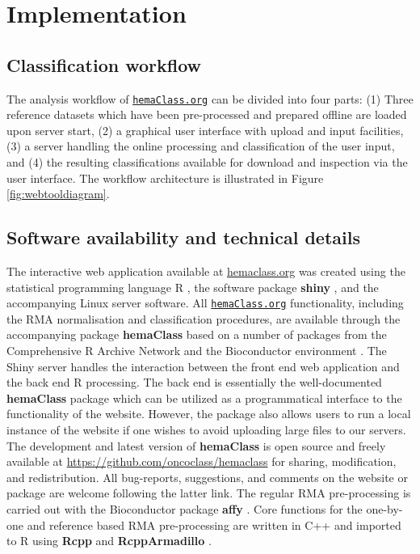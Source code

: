 \documentclass[twocolumn]{bmcart}%
\newcommand{\hemaClass}{\href{http://hemaClass.org}{\texttt{hemaClass.org}}}
\newcommand{\R}{\textsf{R}}
\newcommand{\pkg}[1]{\textbf{#1}}
\begin{document}
\section{Implementation}


\subsection{Classification workflow}
The analysis workflow of \hemaClass{} can be divided into four parts:
(1) Three reference datasets which have been pre-processed and prepared offline are loaded upon server start,
(2) a graphical user interface with upload and input facilities,
(3) a server handling the online processing and classification of the user input, and
(4) the resulting classifications available for download and inspection via the user interface.
The workflow architecture is illustrated in Figure \ref{fig:webtooldiagram}.



\subsection{Software availability and technical details}
The interactive web application available at \url{hemaclass.org} was created using the statistical programming language \R{} \cite{RCoreTeam}, the software package \pkg{shiny} \cite{shiny}, and the accompanying Linux server software.
All \hemaClass{} functionality, including the RMA normalisation and classification procedures, are available through the accompanying package \pkg{hemaClass} based on a number of packages from the Comprehensive R Archive Network \cite{RCoreTeam} and the Bioconductor environment \cite{Gentleman2004}.
The Shiny server handles the interaction between the front end web application and the back end \R{} processing.
The back end is essentially the well-documented \pkg{hemaClass} package which can be utilized as a programmatical interface to the functionality of the website.
However, the package also allows users to run a local instance of the website if one wishes to avoid uploading large files to our servers.
The development and latest version of \pkg{hemaClass} is open source and freely available at \url{https://github.com/oncoclass/hemaclass} for sharing, modification, and redistribution.
All bug-reports, suggestions, and comments on the website or package are welcome following the latter link.
The regular RMA pre-processing is carried out with the Bioconductor package \pkg{affy} \cite{Gautier2004}.
Core functions for the one-by-one and reference based RMA pre-processing are written in \textsf{C++} and imported to \R{} using \pkg{Rcpp} and \pkg{RcppArmadillo} \cite{Rcpp2013,Eddelbuettel2011,RcppArmadillo,Sanderson2010}.
\end{document}
